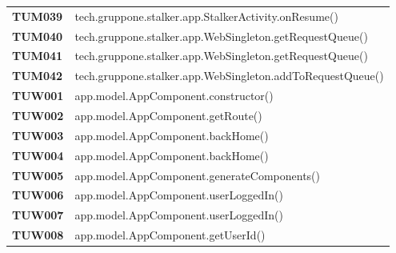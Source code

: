 \documentclass[../../piano-di-qualifica.tex]{subfiles}
\begin{document}
\begin{longtable}[H]{>{\centering\bfseries}m{3cm} >{}m{13cm}}
  TUM039             & tech.gruppone.stalker.app.StalkerActivity.onResume\@()                                                  \\

  TUM040             & tech.gruppone.stalker.app.WebSingleton.getRequestQueue\@()                                              \\

  TUM041             & tech.gruppone.stalker.app.WebSingleton.getRequestQueue\@()                                              \\

  TUM042             & tech.gruppone.stalker.app.WebSingleton.addToRequestQueue\@()                                            \\





  TUW001             & app.model.AppComponent.constructor\@()                                                                  \\

  TUW002             & app.model.AppComponent.getRoute\@()                                                                     \\

  TUW003             & app.model.AppComponent.backHome\@()                                                                     \\

  TUW004             & app.model.AppComponent.backHome\@()                                                                     \\

  TUW005             & app.model.AppComponent.generateComponents\@()                                                           \\

  TUW006             & app.model.AppComponent.userLoggedIn\@()                                                                 \\

  TUW007             & app.model.AppComponent.userLoggedIn\@()                                                                 \\

  TUW008             & app.model.AppComponent.getUserId\@()                                                                    \\


\end{longtable}
\end{document}
